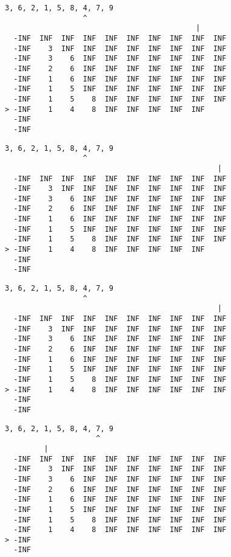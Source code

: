 { \begin{verbatim}
3, 6, 2, 1, 5, 8, 4, 7, 9
                  ^
                                            |
  -INF  INF  INF  INF  INF  INF  INF  INF  INF  INF
  -INF    3  INF  INF  INF  INF  INF  INF  INF  INF
  -INF    3    6  INF  INF  INF  INF  INF  INF  INF
  -INF    2    6  INF  INF  INF  INF  INF  INF  INF
  -INF    1    6  INF  INF  INF  INF  INF  INF  INF
  -INF    1    5  INF  INF  INF  INF  INF  INF  INF
  -INF    1    5    8  INF  INF  INF  INF  INF  INF
> -INF    1    4    8  INF  INF  INF  INF  INF     
  -INF                                             
  -INF                                             
\end{verbatim} }

{ \begin{verbatim}
3, 6, 2, 1, 5, 8, 4, 7, 9
                  ^
                                                 |
  -INF  INF  INF  INF  INF  INF  INF  INF  INF  INF
  -INF    3  INF  INF  INF  INF  INF  INF  INF  INF
  -INF    3    6  INF  INF  INF  INF  INF  INF  INF
  -INF    2    6  INF  INF  INF  INF  INF  INF  INF
  -INF    1    6  INF  INF  INF  INF  INF  INF  INF
  -INF    1    5  INF  INF  INF  INF  INF  INF  INF
  -INF    1    5    8  INF  INF  INF  INF  INF  INF
> -INF    1    4    8  INF  INF  INF  INF  INF     
  -INF                                             
  -INF                                             
\end{verbatim} }

{ \begin{verbatim}
3, 6, 2, 1, 5, 8, 4, 7, 9
                  ^
                                                 |
  -INF  INF  INF  INF  INF  INF  INF  INF  INF  INF
  -INF    3  INF  INF  INF  INF  INF  INF  INF  INF
  -INF    3    6  INF  INF  INF  INF  INF  INF  INF
  -INF    2    6  INF  INF  INF  INF  INF  INF  INF
  -INF    1    6  INF  INF  INF  INF  INF  INF  INF
  -INF    1    5  INF  INF  INF  INF  INF  INF  INF
  -INF    1    5    8  INF  INF  INF  INF  INF  INF
> -INF    1    4    8  INF  INF  INF  INF  INF  INF
  -INF                                             
  -INF                                             
\end{verbatim} }

{ \begin{verbatim}
3, 6, 2, 1, 5, 8, 4, 7, 9
                     ^
         |
  -INF  INF  INF  INF  INF  INF  INF  INF  INF  INF
  -INF    3  INF  INF  INF  INF  INF  INF  INF  INF
  -INF    3    6  INF  INF  INF  INF  INF  INF  INF
  -INF    2    6  INF  INF  INF  INF  INF  INF  INF
  -INF    1    6  INF  INF  INF  INF  INF  INF  INF
  -INF    1    5  INF  INF  INF  INF  INF  INF  INF
  -INF    1    5    8  INF  INF  INF  INF  INF  INF
  -INF    1    4    8  INF  INF  INF  INF  INF  INF
> -INF                                             
  -INF                                             
\end{verbatim} }

